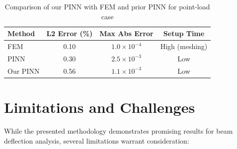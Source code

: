 \documentclass[12pt]{article}
\begin{document}
\begin{table}[htbp]
	\centering
	\begin{tabular}{l c c c}
		\toprule
		\textbf{Method} & \textbf{L2 Error (\%)} & \textbf{Max Abs Error} & \textbf{Setup Time} \\
		\midrule
		FEM & 0.10 & $1.0 \times 10^{-4}$ & High (meshing) \\
		PINN \citep{Zhang2020} & 0.30 & $2.5 \times 10^{-3}$ & Low \\
		Our PINN & 0.56 & $1.1 \times 10^{-3}$ & Low \\
		\bottomrule
	\end{tabular}
	\caption{Comparison of our PINN with FEM and prior PINN for point-load case}
	\label{tab:comparison}
\end{table}

\section{Limitations and Challenges}
While the presented methodology demonstrates promising results for beam deflection analysis, several limitations warrant consideration:
\end{document}
